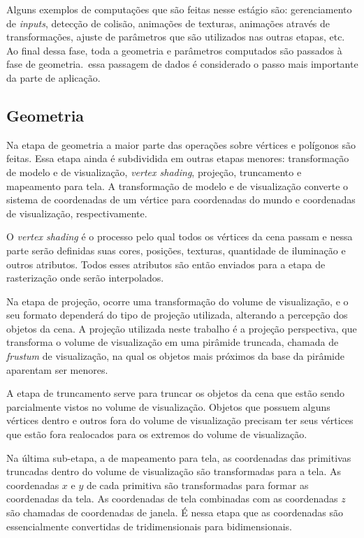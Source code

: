 Alguns exemplos de computações que são feitas nesse estágio são: gerenciamento de \textit{inputs}, 
detecção de colisão, animações de texturas, animações através de transformações, ajuste 
de parâmetros que são utilizados nas outras etapas, etc. Ao final dessa fase, toda a 
geometria e parâmetros computados são passados à fase de geometria.\ essa passagem de 
dados é considerado o passo mais importante da parte de aplicação.

\subsection{Geometria}

Na etapa de geometria a maior parte das operações sobre vértices e polígonos são feitas. 
Essa etapa ainda é subdividida em outras etapas menores: transformação de modelo e de 
visualização, \textit{vertex shading}, projeção, truncamento e mapeamento para tela. 
A transformação de modelo e de visualização converte o sistema de coordenadas de um 
vértice para coordenadas do mundo e coordenadas de visualização, respectivamente.

O \textit{vertex shading} é o processo pelo qual todos os vértices da cena passam e nessa 
parte serão definidas suas cores, posições, texturas, quantidade de iluminação e outros 
atributos. Todos esses atributos são então enviados para a etapa de rasterização onde 
serão interpolados.

Na etapa de projeção, ocorre uma transformação do volume de visualização, e o seu formato 
dependerá do tipo de projeção utilizada, alterando a percepção dos objetos da cena. 
A projeção utilizada neste trabalho 
é a projeção perspectiva, que transforma o volume de visualização em uma pirâmide 
truncada, chamada de \textit{frustum} de visualização, na qual os objetos mais próximos 
da base da pirâmide aparentam ser menores.

A etapa de truncamento serve para truncar os objetos da cena que estão sendo parcialmente 
vistos no volume de visualização. Objetos que possuem alguns vértices dentro e outros 
fora do volume de visualização precisam ter seus vértices que estão fora realocados para 
os extremos do volume de visualização.

Na última sub-etapa, a de mapeamento para tela, as coordenadas das primitivas truncadas 
dentro do volume de visualização são transformadas para a tela. As coordenadas $x$ e 
$y$ de cada primitiva são transformadas para formar as coordenadas da tela. As coordenadas 
de tela combinadas com as coordenadas $z$ são chamadas de coordenadas de janela. É nessa 
etapa que as coordenadas são essencialmente convertidas de tridimensionais para 
bidimensionais.

